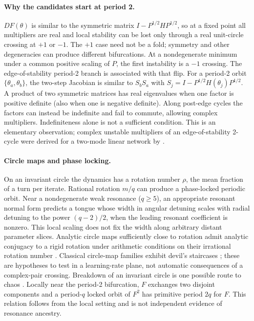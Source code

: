 \documentclass[11pt,letterpaper]{article}
\begin{document}
\paragraph{Why the candidates start at period 2.} $DF(\theta)$ is similar to the symmetric matrix
$I - P^{1/2} H P^{1/2}$, so at a fixed point all multipliers are real and local stability can be lost only through a real
unit-circle crossing at $+1$ or $-1$. The $+1$ case need not be a fold; symmetry and other degeneracies
can produce different bifurcations. At a nondegenerate minimum under a common positive scaling of $P$,
the first instability is a $-1$ crossing. The edge-of-stability period-2 branch is associated with that flip. For a period-2 orbit
$\{\theta_a,\theta_b\}$, the two-step Jacobian is similar to $S_b S_a$ with
$S_j = I - P^{1/2} H(\theta_j) P^{1/2}$. A product of two symmetric matrices has real eigenvalues when one factor
is positive definite (also when one is negative definite). Along post-edge cycles the factors can instead be
indefinite and fail to commute, allowing complex multipliers. Indefiniteness alone is not a sufficient condition. This is an elementary observation; complex unstable
multipliers of an edge-of-stability 2-cycle were derived for a two-mode linear network by \citet{hofmann2026}.

\paragraph{Circle maps and phase locking.} On an invariant circle the dynamics has a rotation number $\rho$,
the mean fraction of a turn per iterate. Rational rotation $m/q$ can produce a phase-locked periodic orbit.
Near a nondegenerate weak resonance ($q\geq5$), an appropriate resonant normal form predicts a tongue whose
width in angular detuning scales with radial detuning to the power $(q-2)/2$, when the leading resonant
coefficient is nonzero. This local scaling does not fix the width along arbitrary distant parameter slices.
Analytic circle maps sufficiently close to rotation admit analytic conjugacy to a rigid rotation under
arithmetic conditions on their irrational rotation number \citep{arnold1965}. Classical circle-map families exhibit devil's staircases
\citep{jensen1983,jensen1984}; these are hypotheses to test in a learning-rate plane, not automatic
consequences of a complex-pair crossing. Breakdown of an invariant circle is one possible route to chaos
\citep{curry1978,aronson1982,ostlund1983}. Locally near the period-2 bifurcation, $F$ exchanges two disjoint
components and a period-$q$ locked orbit of $F^2$ has primitive period $2q$ for $F$. This relation follows from
the local setting and is not independent evidence of resonance ancestry.
\end{document}

